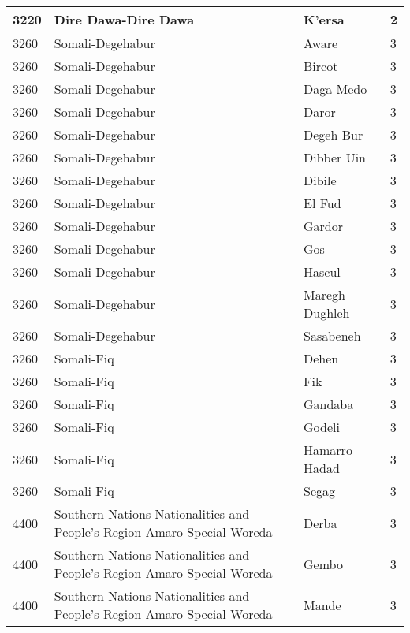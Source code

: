 \documentclass[12pt,a4paper,openbib,titlepage]{report}
\begin{document}
\begin{longtable}{|p{2cm}|p{6.5cm}|p{8cm}|p{1.5cm}|}
\rule[-1ex]{0pt}{2.5ex} 3220 & Dire Dawa-Dire Dawa & K'ersa & 2 \\ 
\hline 
\rule[-1ex]{0pt}{2.5ex} 3260 & Somali-Degehabur & Aware & 3 \\
\hline 
\rule[-1ex]{0pt}{2.5ex} 3260 & Somali-Degehabur & Bircot & 3 \\
\hline 
\rule[-1ex]{0pt}{2.5ex} 3260 & Somali-Degehabur & Daga Medo & 3 \\ 
\hline 
\rule[-1ex]{0pt}{2.5ex} 3260 & Somali-Degehabur & Daror & 3 \\
\hline 
\rule[-1ex]{0pt}{2.5ex} 3260 & Somali-Degehabur & Degeh Bur & 3 \\
\hline 
\rule[-1ex]{0pt}{2.5ex} 3260 & Somali-Degehabur & Dibber Uin & 3 \\ 
\hline 
\rule[-1ex]{0pt}{2.5ex} 3260 & Somali-Degehabur & Dibile & 3 \\ 
\hline 
\rule[-1ex]{0pt}{2.5ex} 3260 & Somali-Degehabur & El Fud & 3 \\ 
\hline 
\rule[-1ex]{0pt}{2.5ex} 3260 & Somali-Degehabur & Gardor & 3 \\ 
\hline 
\rule[-1ex]{0pt}{2.5ex} 3260 & Somali-Degehabur & Gos & 3 \\ 
\hline 
\rule[-1ex]{0pt}{2.5ex} 3260 & Somali-Degehabur & Hascul & 3 \\ 
\hline 
\rule[-1ex]{0pt}{2.5ex} 3260 & Somali-Degehabur & Maregh Dughleh & 3 \\ 
\hline 
\rule[-1ex]{0pt}{2.5ex} 3260 & Somali-Degehabur & Sasabeneh & 3 \\ 
\hline 
\rule[-1ex]{0pt}{2.5ex} 3260 & Somali-Fiq & Dehen & 3 \\ 
\hline 
\rule[-1ex]{0pt}{2.5ex} 3260 & Somali-Fiq & Fik & 3 \\ 
\hline 
\rule[-1ex]{0pt}{2.5ex} 3260 & Somali-Fiq & Gandaba & 3 \\  
\hline 
\rule[-1ex]{0pt}{2.5ex} 3260 & Somali-Fiq & Godeli & 3 \\ 
\hline 
\rule[-1ex]{0pt}{2.5ex} 3260 & Somali-Fiq & Hamarro Hadad & 3 \\ 
\hline 
\rule[-1ex]{0pt}{2.5ex} 3260 & Somali-Fiq & Segag & 3 \\ 
\hline 
\rule[-1ex]{0pt}{2.5ex} 4400 & Southern Nations Nationalities and People's Region-Amaro Special Woreda & Derba & 3 \\ 
\hline 
\rule[-1ex]{0pt}{2.5ex} 4400 & Southern Nations Nationalities and People's Region-Amaro Special Woreda & Gembo & 3 \\ 
\hline 
\rule[-1ex]{0pt}{2.5ex} 4400 & Southern Nations Nationalities and People's Region-Amaro Special Woreda & Mande & 3 \\ 

\end{longtable}
\end{document}
